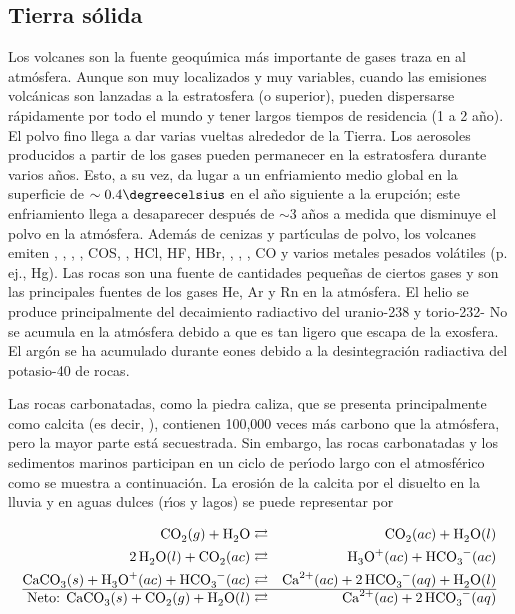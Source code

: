 \subsection{Tierra s\'olida}
Los volcanes son la fuente geoqu\'{\i}mica m\'as importante de gases traza en al atm\'osfera. Aunque son muy localizados y muy variables, cuando las emisiones volc\'anicas son lanzadas a la estratosfera (o superior), pueden dispersarse r\'apidamente por todo el mundo y tener largos tiempos de residencia (1 a 2 a\~no). El polvo fino  llega a dar varias vueltas alrededor de la Tierra. Los aerosoles producidos a partir de los gases pueden permanecer en la estratosfera durante varios a\~nos. Esto, a su vez, da lugar a un enfriamiento medio global en la superficie de $\sim0.4\degreecelsius$ en el a\~no siguiente a la erupci\'on; este enfriamiento llega a desaparecer despu\'es de $\sim$3 a\~nos a medida que disminuye el polvo en la atm\'osfera. Adem\'as de cenizas y part\'{\i}culas de polvo, los volcanes emiten , , , , COS, , HCl, HF, HBr, , , , CO y varios metales pesados vol\'atiles (p. ej., Hg). Las rocas son una fuente de  cantidades peque\~nas de ciertos gases y son las principales fuentes de los gases He, Ar y Rn en la atm\'osfera. El helio se produce principalmente del decaimiento radiactivo del uranio-238 y torio-232- No se acumula en la atm\'osfera debido a que es tan ligero que escapa de la exosfera. El arg\'on se ha acumulado durante eones debido a la desintegraci\'on radiactiva del potasio-40 de rocas.

Las rocas carbonatadas, como la piedra caliza, que se presenta principalmente como calcita (es decir, ), contienen 100,000 veces m\'as carbono que la atm\'osfera, pero la mayor parte est\'a secuestrada. Sin embargo, las rocas carbonatadas y los sedimentos marinos participan en un ciclo de per\'{\i}odo largo con el  atmosf\'erico como se muestra a continuaci\'on. La erosi\'on de la calcita por el  disuelto en la lluvia y en aguas dulces (r\'{\i}os y lagos) se puede representar por

\begin{footnotesize}
\begin{eqnarray}
\ce{CO2}(g) + \ce{H2O} &\rightleftarrows& \ce{CO2}(ac) + \ce{H2O}(l)  \label{eq_co2h2o}\\
\ce{2H2O}(l) +   \ce{CO2}(ac)&\rightleftarrows&   \ce{H3O^+}(ac) +  \ce{HCO3^-}(ac) \label{eq_co2}\\
\ce{CaCO3}(s) +   \ce{H3O^+}(ac) +  \ce{HCO3^-}(ac) &\rightleftarrows& \ce{Ca^{2+}}(ac) + \ce{2HCO3^-}(aq) + \ce{H2O}(l)\label{eq_caco3}\\\hline
\textrm{Neto:       }   \ce{CaCO3}(s) +\ce{CO2}(g) + \ce{H2O}(l)  &\rightleftarrows&\ce{Ca^{2+}}(ac) + \ce{2HCO3^-}(aq)  \label{eq_cca}
\end{eqnarray}
\end{footnotesize}

